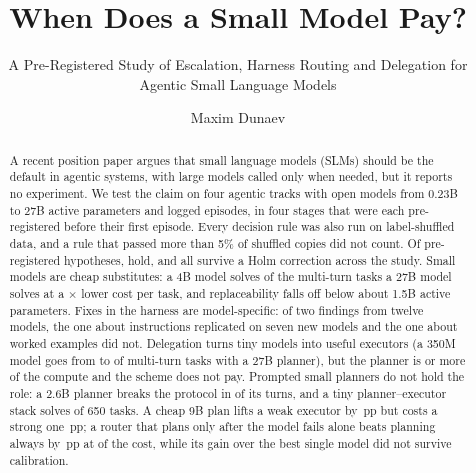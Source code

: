 

\usepackage{booktabs}
\newcommand{\pp}{\,pp}
\setlength{\emergencystretch}{2em}  %

\title{When Does a Small Model Pay?}
\subtitle{A Pre-Registered Study of Escalation, Harness Routing and Delegation for Agentic Small Language Models}

\author{Maxim Dunaev}

\begin{abstract}
A recent position paper argues that small language models (SLMs) should be the default in agentic systems, with large
models called only when needed, but it reports no experiment. We test the claim on four agentic tracks with
\nModels{} open models from 0.23B to 27B active parameters and \nEpisodes{} logged episodes, in four stages that were
each pre-registered before their first episode. Every decision rule was also run on label-shuffled data, and a rule
that passed more than 5\% of shuffled copies did not count. Of \nHypotheses{} pre-registered hypotheses, \nHolds{} hold, and
all \nHolm{} survive a Holm correction across the study. Small models are cheap substitutes: a 4B model solves
\replFourMT{} of the multi-turn tasks a 27B model solves at a \costFour{}$\times$ lower cost per task, and replaceability
falls off below about 1.5B active parameters. Fixes in the harness are model-specific: of two findings from twelve
models, the one about instructions replicated on seven new models and the one about worked examples did not.
Delegation turns tiny models into useful executors (a 350M model goes from \tinyAloneMT{} to \tinyPlanMT{} of multi-turn
tasks with a 27B planner), but the planner is \plannerShareLo{} or more of the compute and the scheme does not pay.
Prompted small planners do not hold the role: a 2.6B planner breaks the protocol in \protoLfm{} of its turns, and a
tiny planner--executor stack solves \tinyStackQ{} of 650 tasks. A cheap 9B plan lifts a weak executor by \liftTiny\pp{}
but costs a strong one \hurtFour\pp{}; a router that plans only after the model fails alone beats planning always by
\routerVsPlan\pp{} at \routerCost{} of the cost, while its gain over the best single model did not survive calibration.
\end{abstract}
